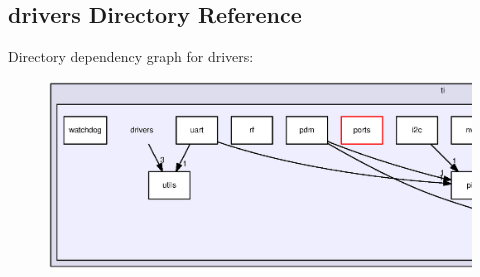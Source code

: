 \subsection{drivers Directory Reference}
\label{dir_3272f9f9556099c0b986cb38fa788482}
Directory dependency graph for drivers\+:
\nopagebreak
\begin{figure}[H]
\begin{center}
\leavevmode
\includegraphics[width=350pt]{dir_3272f9f9556099c0b986cb38fa788482_dep}
\end{center}
\end{figure}
